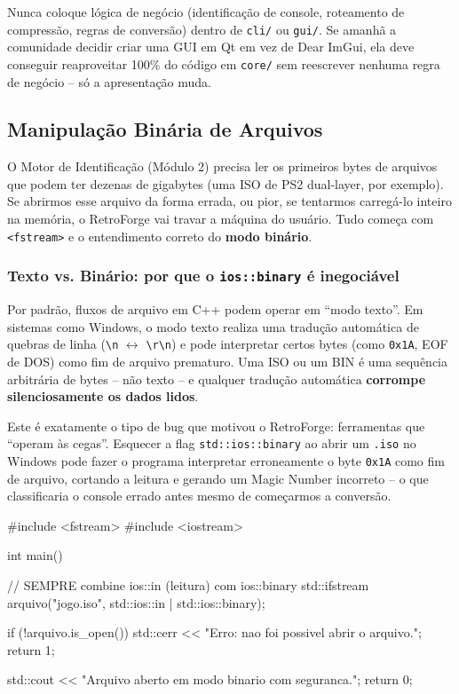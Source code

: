 \begin{CaixaAlerta}
Nunca coloque lógica de negócio (identificação de console, roteamento de compressão, regras de conversão) dentro de \texttt{cli/} ou \texttt{gui/}. Se amanhã a comunidade decidir criar uma GUI em Qt em vez de Dear ImGui, ela deve conseguir reaproveitar 100\% do código em \texttt{core/} sem reescrever nenhuma regra de negócio -- só a apresentação muda.
\end{CaixaAlerta}

\subsection{Manipulação Binária de Arquivos}

O Motor de Identificação (Módulo 2) precisa ler os primeiros bytes de arquivos que podem ter dezenas de gigabytes (uma ISO de PS2 dual-layer, por exemplo). Se abrirmos esse arquivo da forma errada, ou pior, se tentarmos carregá-lo inteiro na memória, o RetroForge vai travar a máquina do usuário. Tudo começa com \texttt{<fstream>} e o entendimento correto do \textbf{modo binário}.

\subsubsection{Texto vs. Binário: por que o \texttt{ios::binary} é inegociável}

Por padrão, fluxos de arquivo em C++ podem operar em ``modo texto''. Em sistemas como Windows, o modo texto realiza uma tradução automática de quebras de linha (\texttt{\textbackslash n} $\leftrightarrow$ \texttt{\textbackslash r\textbackslash n}) e pode interpretar certos bytes (como \texttt{0x1A}, EOF de DOS) como fim de arquivo prematuro. Uma ISO ou um BIN é uma sequência arbitrária de bytes -- não texto -- e qualquer tradução automática \textbf{corrompe silenciosamente os dados lidos}.

\begin{CaixaAlerta}
Este é exatamente o tipo de bug que motivou o RetroForge: ferramentas que ``operam às cegas''. Esquecer a flag \texttt{std::ios::binary} ao abrir um \texttt{.iso} no Windows pode fazer o programa interpretar erroneamente o byte \texttt{0x1A} como fim de arquivo, cortando a leitura e gerando um Magic Number incorreto -- o que classificaria o console errado antes mesmo de começarmos a conversão.
\end{CaixaAlerta}

\begin{CaixaCodigo}
#include <fstream>
#include <iostream>

int main() {
    // SEMPRE combine ios::in (leitura) com ios::binary
    std::ifstream arquivo("jogo.iso", std::ios::in | std::ios::binary);

    if (!arquivo.is_open()) {
        std::cerr << "Erro: nao foi possivel abrir o arquivo.\n";
        return 1;
    }

    std::cout << "Arquivo aberto em modo binario com seguranca.\n";
    return 0;
}
\end{CaixaCodigo}

